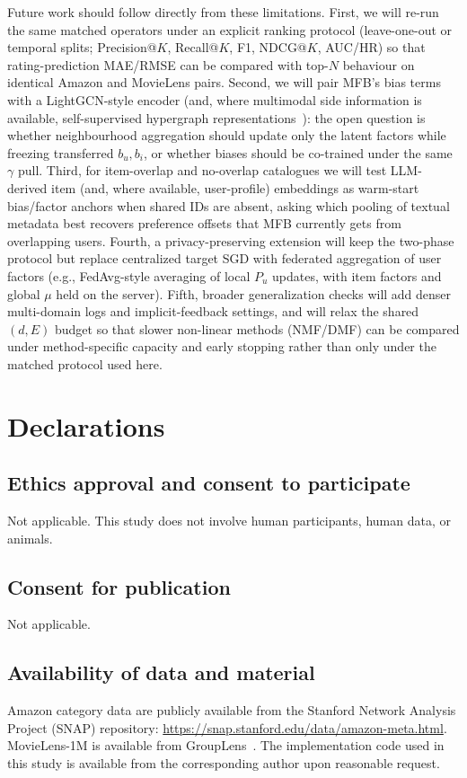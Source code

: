 \documentclass[pdflatex,sn-mathphys-num]{sn-jnl}%
\theoremstyle{thmstyleone}%
\theoremstyle{thmstyletwo}%
\theoremstyle{thmstylethree}%
\begin{document}
Future work should follow directly from these limitations. First, we will re-run the same matched operators under an explicit ranking protocol (leave-one-out or temporal splits; Precision@$K$, Recall@$K$, F1, NDCG@$K$, AUC/HR) so that rating-prediction MAE/RMSE can be compared with top-$N$ behaviour on identical Amazon and MovieLens pairs. Second, we will pair MFB's bias terms with a LightGCN-style encoder (and, where multimodal side information is available, self-supervised hypergraph representations~\cite{shu2024self}): the open question is whether neighbourhood aggregation should update only the latent factors while freezing transferred $b_u,b_i$, or whether biases should be co-trained under the same $\gamma$ pull. Third, for item-overlap and no-overlap catalogues we will test LLM-derived item (and, where available, user-profile) embeddings as warm-start bias/factor anchors when shared IDs are absent, asking which pooling of textual metadata best recovers preference offsets that MFB currently gets from overlapping users. Fourth, a privacy-preserving extension will keep the two-phase protocol but replace centralized target SGD with federated aggregation of user factors (e.g., FedAvg-style averaging of local $P_u$ updates, with item factors and global $\mu$ held on the server). Fifth, broader generalization checks will add denser multi-domain logs and implicit-feedback settings, and will relax the shared $(d,E)$ budget so that slower non-linear methods (NMF/DMF) can be compared under method-specific capacity and early stopping rather than only under the matched protocol used here.

\section*{Declarations}

\subsection*{Ethics approval and consent to participate}
Not applicable. This study does not involve human participants, human data, or animals.

\subsection*{Consent for publication}
Not applicable.

\subsection*{Availability of data and material}
Amazon category data are publicly available from the Stanford Network Analysis Project (SNAP) repository: \url{https://snap.stanford.edu/data/amazon-meta.html}. MovieLens-1M is available from GroupLens~\cite{harper2015movielens}. The implementation code used in this study is available from the corresponding author upon reasonable request.
\end{document}

